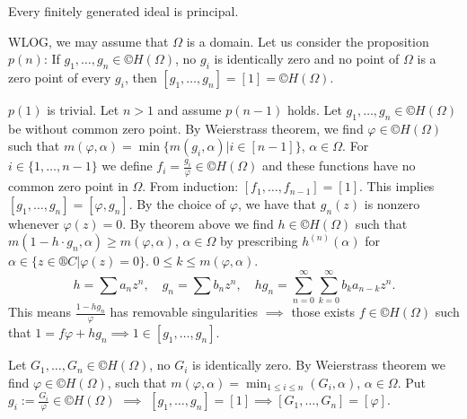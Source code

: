 \documentclass[12pt]{article}					%
\begin{document}
\begin{veta}
	Every finitely generated ideal is principal.

	\begin{dukazin}
		WLOG, we may assume that $Ω$ is a domain. Let us consider the proposition $p(n)$: If $g_1, …, g_n \in ©H(Ω)$, no $g_i$ is identically zero and no point of $Ω$ is a zero point of every $g_i$, then $[g_1, …, g_n] = [1] = ©H(Ω)$.

		$p(1)$ is trivial. Let $n > 1$ and assume $p(n-1)$ holds. Let $g_1, …, g_n \in ©H(Ω)$ be without common zero point. By Weierstrass theorem, we find $φ \in ©H(Ω)$ such that $m(φ, α) = \min\{m(g_i, α) | i \in [n-1]\}$, $\alpha \in Ω$. For $i \in \{1, …, n-1\}$ we define $f_i = \frac{g_i}{φ} \in ©H(Ω)$ and these functions have no common zero point in $Ω$. From induction: $[f_1, …, f_{n-1}] = [1]$. This implies $[g_1, …, g_n] = [φ, g_n]$. By the choice of $φ$, we have that $g_n(z)$ is nonzero whenever $φ(z) = 0$. By theorem above we find $h \in ©H(Ω)$ such that $m(1 - h·g_n, α) ≥ m(φ, α)$, $α \in Ω$ by prescribing $h^{(n)}(α)$ for $α \in \{z \in ®C | φ(z) = 0\}$. $0 ≤ k ≤ m(φ, α)$.
		$$ h = \sum a_n z^n, \quad g_n = \sum b_n z^n, \quad hg_n = \sum_{n=0}^∞ \sum_{k=0}^∞ b_k a_{n-k} z^n. $$
		This means $\frac{1 - hg_n}{φ}$ has removable singularities $\implies$ those exists $f \in ©H(Ω)$ such that $1 = fφ + hg_n \implies 1 \in [g_1, …, g_n]$.

		Let $G_1, …, G_n \in ©H(Ω)$, no $G_i$ is identically zero. By Weierstrass theorem we find $φ \in ©H(Ω)$, such that $m(φ, α) = \min_{1 ≤ i ≤ n} (G_i, α)$, $α \in Ω$. Put $g_i := \frac{G_i}{φ} \in ©H(Ω)$ $\implies$ $[g_1, …, g_n] = [1] \implies [G_1, …, G_n] = [φ]$.
	\end{dukazin}
\end{veta}
\end{document}
